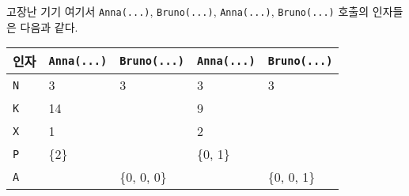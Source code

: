 \begin{problem}{고장난 기기}
여기서 \texttt{Anna(...)}, \texttt{Bruno(...)}, \texttt{Anna(...)}, \texttt{Bruno(...)} 호출의 인자들은 다음과 같다.

\begin{tabular}{|l|l|l|l|l|}
	\hline
	인자 & \texttt{Anna(...)} &  \texttt{Bruno(...)} & \texttt{Anna(...)}  & \texttt{Bruno(...)} \\ \hline
	\texttt{N}  & 3     & 3           & 3        & 3           \\ \hline
	\texttt{K}  & 14    &             & 9        &             \\ \hline
	\texttt{X}  & 1     &             & 2        &             \\ \hline
	\texttt{P}  & \{2\} &             & \{0, 1\} &             \\ \hline
	\texttt{A}  &       & \{0, 0, 0\} &          & \{0, 0, 1\} \\ \hline
\end{tabular}

\end{problem}

